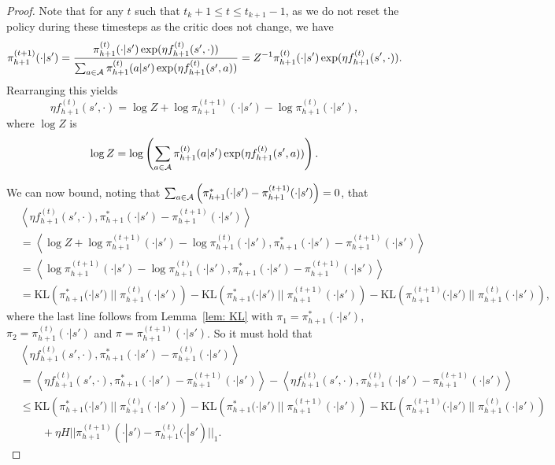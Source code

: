 \begin{proof}
Note that for any $t$ such that $t_k + 1 \leq t \leq t_{k+1}-1$, as we do not reset the policy during these timesteps as the critic does not change, we have 
\begin{align}\pi_{h+1}^{(t+1)}(\cdot | s') = \frac{\pi_{h+1}^{(t)}(\cdot | s') \exp(\eta f_{h+1}^{(t)}(s', \cdot))}{\sum_{a \in {\mathcal{A}}} \pi_{h+1}^{(t)}(a | s') \exp(\eta f_{h+1}^{(t)}(s', a))} = Z^{-1}\pi_{h+1}^{(t)}(\cdot | s') \exp(\eta f_{h+1}^{(t)}(s', \cdot)).\end{align}
Rearranging this yields
$$\eta f_{h+1}^{(t)}(s', \cdot) = \log Z + \log \pi_{h+1}^{(t+1)}(\cdot | s') - \log \pi_{h+1}^{(t)}(\cdot | s'),$$
where $\log Z$ is
$$\log Z = \log\left(\sum_{a \in {\mathcal{A}}} \pi_{h+1}^{(t)}(a | s') \exp(\eta f_{h+1}^{(t)}(s', a))\right).$$

We can now bound, noting that $\sum_{a \in {\mathcal{A}}} \left(\pi_{h+1}^{*}(\cdot | s') - \pi_{h+1}^{(t+1)}(\cdot | s')\right) = 0$, that
\begin{align}\label{eqn:mirror-alg2-1}
    &\left\langle \eta f_{h+1}^{(t)}(s', \cdot), \pi_{h+1}^{*}(\cdot | s') - \pi_{h+1}^{(t+1)}(\cdot | s')\right\rangle \nonumber\\
    &= \left\langle \log Z + \log \pi_{h+1}^{{(t+1)}}(\cdot | s') - \log \pi_{h+1}^{(t)}(\cdot | s'), \pi_{h+1}^{*}(\cdot | s') - \pi_{h+1}^{(t+1)}(\cdot | s')\right\rangle \nonumber\\ 
    &=\left\langle \log \pi_{h+1}^{{(t+1)}}(\cdot | s') - \log \pi_{h+1}^{(t)}(\cdot | s'), \pi_{h+1}^{*}(\cdot | s') - \pi_{h+1}^{(t+1)}(\cdot | s')\right\rangle \nonumber\\
    &= \text{KL}\left(\pi_{h+1}^{*}(\cdot | s')\; || \;\pi_{h+1}^{(t)}(\cdot | s')\right) - \text{KL}\left(\pi_{h+1}^{*}(\cdot | s')\; || \;\pi_{h+1}^{(t+1)}(\cdot | s')\right) - \text{KL}\left(\pi_{h+1}^{(t+1)}(\cdot | s')\; || \;\pi_{h+1}^{(t)}(\cdot | s')\right),
\end{align}
where the last line follows from Lemma~\ref{lem: KL} with $\pi_1 = \pi_{h+1}^{*}(\cdot | s')$, $\pi_2 = \pi_{h+1}^{(t)}(\cdot | s')$ and $\pi= \pi_{h+1}^{(t+1)}(\cdot | s')$. So it must hold that
\begin{align}\label{eqn:mirror-alg2-2}
    &\left\langle \eta f_{h+1}^{(t)}(s', \cdot), \pi_{h+1}^{*}(\cdot | s') - \pi_{h+1}^{(t)}(\cdot | s')\right\rangle  \nonumber\\
    &= \left\langle \eta f_{h+1}^{(t)}(s', \cdot), \pi_{h+1}^{*}(\cdot | s') - \pi_{h+1}^{(t+1)}(\cdot | s')\right\rangle - \left\langle \eta f_{h+1}^{(t)}(s', \cdot), \pi_{h+1}^{(t)}(\cdot | s') - \pi_{h+1}^{(t+1)}(\cdot | s')\right\rangle \nonumber\\
    &\leq \text{KL}\left(\pi_{h+1}^{*}(\cdot | s')\; || \;\pi_{h+1}^{(t)}(\cdot | s')\right) - \text{KL}\left(\pi_{h+1}^{*}(\cdot | s')\; || \;\pi_{h+1}^{(t+1)}(\cdot | s')\right) - \text{KL}\left(\pi_{h+1}^{(t+1)}(\cdot | s')\; || \;\pi_{h+1}^{(t)}(\cdot | s')\right) \nonumber\\
    &\qquad + \eta H ||\pi_{h+1}^{(t+1)}(\cdot | s') - \pi_{h+1}^{(t)}(\cdot | s')||_1.
\end{align}


\end{proof}
